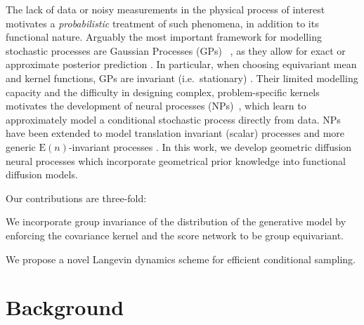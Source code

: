 The lack of data or noisy measurements in the physical process of interest motivates a \emph{probabilistic} treatment of such phenomena, in addition to its functional nature.
Arguably the most important framework for modelling stochastic processes are Gaussian Processes (GPs) ~\parencite{rasmussen2003gaussian}, as they allow for exact or approximate posterior prediction \parencite{titsias2009Variational,rahimi2007random,wilson2020efficiently}.
In particular, when choosing equivariant mean and kernel functions, GPs are invariant (i.e.~stationary) \parencite{holderrieth2021equivariant, azangulov2023stationary, azangulov2023stationary2}.
Their limited modelling capacity and the difficulty in designing complex, problem-specific kernels motivates the development of neural processes (NPs)~\cite{garnelo2018neural}, which learn to approximately model a conditional stochastic process directly from data.
NPs have been extended to model translation invariant (scalar) processes \parencite{gordon2019Convolutional} and more generic \(\mathrm{E}(n)\)-invariant processes \parencite{holderrieth2021equivariant}.
In this work, we develop geometric diffusion neural processes which incorporate geometrical prior knowledge into functional diffusion models.

Our contributions are three-fold: \begin{enumerate*}[label=(\alph*)] \item We incorporate group invariance of the distribution of the generative model by enforcing the covariance kernel and the score network to be group equivariant.
	\item We propose a novel Langevin dynamics scheme for efficient conditional sampling.
\end{enumerate*}

\section{Background}
\label{sec:background}

